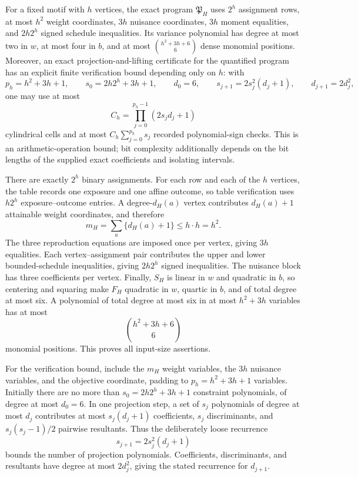 For a fixed motif with \(h\) vertices, the exact program \(\mathfrak P_H\) uses \(2^h\) assignment rows, at most \(h^2\) weight coordinates, \(3h\) nuisance coordinates, \(3h\) moment equalities, and \(2h2^h\) signed schedule inequalities.  Its variance polynomial has degree at most two in \(w\), at most four in \(b\), and at most \(\binom{h^2+3h+6}{6}\) dense monomial positions.  Moreover, an exact projection-and-lifting certificate for the quantified program has an explicit finite verification bound depending only on \(h\): with
\[
p_h=h^2+3h+1,\qquad s_0=2h2^h+3h+1,\qquad d_0=6,\qquad
s_{j+1}=2s_j^2(d_j+1),\qquad d_{j+1}=2d_j^2,
\]
one may use at most
\[
C_h=\prod_{j=0}^{p_h-1}(2s_jd_j+1)
\]
cylindrical cells and at most \(C_h\sum_{j=0}^{p_h}s_j\) recorded polynomial-sign checks.  This is an arithmetic-operation bound; bit complexity additionally depends on the bit lengths of the supplied exact coefficients and isolating intervals.

There are exactly \(2^h\) binary assignments.  For each row and each of the \(h\) vertices, the table records one exposure and one affine outcome, so table verification uses \(h2^h\) exposure--outcome entries.  A degree-\(d_H(a)\) vertex contributes \(d_H(a)+1\) attainable weight coordinates, and therefore
\[
m_H=\sum_a\{d_H(a)+1\}\le h\cdot h=h^2.
\]
The three reproduction equations are imposed once per vertex, giving \(3h\) equalities.  Each vertex--assignment pair contributes the upper and lower bounded-schedule inequalities, giving \(2h2^h\) signed inequalities.  The nuisance block has three coefficients per vertex.  Finally, \(S_H\) is linear in \(w\) and quadratic in \(b\), so centering and squaring make \(F_H\) quadratic in \(w\), quartic in \(b\), and of total degree at most six.  A polynomial of total degree at most six in at most \(h^2+3h\) variables has at most
\[
\binom{h^2+3h+6}{6}
\]
monomial positions.  This proves all input-size assertions.

For the verification bound, include the \(m_H\) weight variables, the \(3h\) nuisance variables, and the objective coordinate, padding to \(p_h=h^2+3h+1\) variables.  Initially there are no more than \(s_0=2h2^h+3h+1\) constraint polynomials, of degree at most \(d_0=6\).  In one projection step, a set of \(s_j\) polynomials of degree at most \(d_j\) contributes at most \(s_j(d_j+1)\) coefficients, \(s_j\) discriminants, and \(s_j(s_j-1)/2\) pairwise resultants.  Thus the deliberately loose recurrence
\[
s_{j+1}=2s_j^2(d_j+1)
\]
bounds the number of projection polynomials.  Coefficients, discriminants, and resultants have degree at most \(2d_j^2\), giving the stated recurrence for \(d_{j+1}\).

